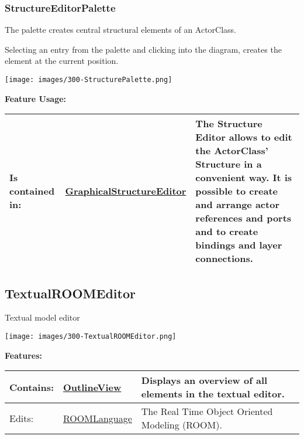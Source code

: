 	
	\vspace{\baselineskip}
	\vspace{\baselineskip}
	\vspace{\baselineskip}
	
\subsubsection{StructureEditorPalette}
	\hypertarget{ref:StructureEditorPalette}{}
	The palette creates central structural elements of an ActorClass.
		
	Selecting an entry from the palette and clicking into the diagram, creates the element at the current position.
	\begin{center}
	\texttt{[image: images/300-StructurePalette.png]}
	\end{center}
		
		
		
	\begingroup
	\textbf{Feature Usage:}
	\renewcommand{\arraystretch}{1.8} %
	\begin{longtable}{l|l p{}}
		\hline
	Is contained in: & \tabitem \hyperlink{ref:GraphicalStructureEditor}{GraphicalStructureEditor}  & The Structure Editor allows to edit the ActorClass' Structure in a convenient way. It is possible to create and arrange actor references and ports and to create bindings and layer connections.\\
	\hline
	\end{longtable}
	\endgroup
		
	
	\vspace{\baselineskip}
	\vspace{\baselineskip}
	\vspace{\baselineskip}
	
\subsection{TextualROOMEditor}
	\hypertarget{ref:TextualROOMEditor}{}
	Textual model editor
		
	\begin{center}
		\texttt{[image: images/300-TextualROOMEditor.png]}
	\end{center}
		
		
	\begingroup
	\textbf{Features:}
	\renewcommand{\arraystretch}{1.8} %
	\begin{longtable}{l|l p{}}
		\hline
	Contains: & \tabitem \hyperlink{ref:OutlineView}{OutlineView}  & Displays an overview of all elements in the textual editor.\\
	\hline
	Edits: & \tabitem \hyperlink{ref:ROOMLanguage}{ROOMLanguage}  & The Real Time Object Oriented Modeling (ROOM).\\
	\hline
	\end{longtable}
	\endgroup
		
